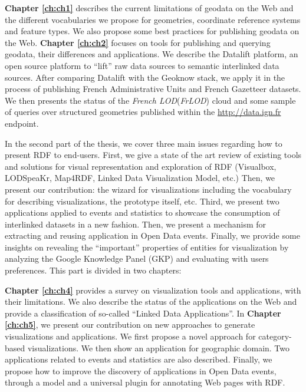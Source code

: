  
  \textbf{Chapter \ref{ch:ch1}} describes the current limitations of geodata on the Web and the different vocabularies we propose for geometries, coordinate reference systems and feature  types. We also propose  some best practices for publishing geodata on the Web.
 \textbf{Chapter \ref{ch:ch2}} focuses on tools for publishing and querying geodata, their differences and applications. We describe the Datalift platform, an open source platform to ``lift'' raw data sources to semantic interlinked data sources. After comparing Datalift with the Geoknow stack, we apply it in the process of publishing French Administrative Units and French Gazetteer datasets. We then presents the status of the \textit{French LOD}(\textit{FrLOD}) cloud and some sample of queries over structured geometries published within the \url{http://data.ign.fr} endpoint. 
 

 In the second part of the thesis, we cover three main issues regarding how to present RDF to end-users. First, we give a state of the art review of existing tools and solutions for visual representation and exploration of RDF (Visualbox, LODSpeaKr, Map4RDF, Linked Data Visualization Model, etc.) Then, we present our contribution: the wizard for visualizations including the vocabulary for describing visualizations, the prototype itself, etc. Third, we present two applications applied to events and statistics to showcase the consumption of interlinked datasets in a new fashion. Then, we present a mechanism for extracting and reusing application in Open Data events. Finally, we provide some insights on revealing the ``important'' properties of entities for visualization by analyzing the Google Knowledge Panel (GKP) and evaluating with users preferences. This part is divided in two chapters:
 
  \textbf{Chapter \ref{ch:ch4}} provides a survey on visualization tools and applications, with their limitations. We also describe the status of the applications on the Web and provide a classification of so-called ``Linked Data Applications''.
   In \textbf{Chapter \ref{ch:ch5}}, we present our contribution on new approaches to generate visualizations and applications. We first propose a novel approach for category-based visualizations. We then show an application for geographic domain. Two applications related to events and statistics are also described. Finally, we propose how to improve the discovery of applications in Open Data events, through a model and a universal plugin for annotating Web pages with RDF. 


